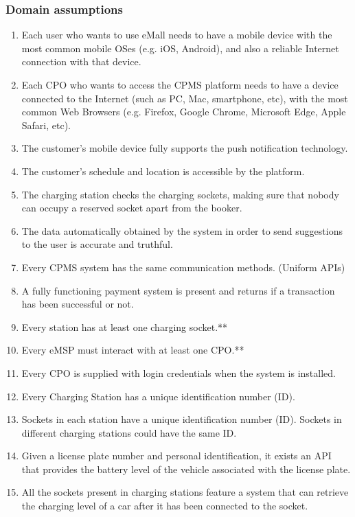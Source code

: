 \subsubsection{Domain assumptions}
\begin{enumerate}[label=\textbf{D\arabic*}:]
    \item Each user who wants to use eMall needs to have a mobile device with the most common mobile OSes (e.g. iOS, Android), and also a reliable Internet connection with that device.
    \item Each CPO who wants to access the CPMS platform needs to have a device connected to the Internet (such as PC, Mac, smartphone, etc), with the most common Web Browsers (e.g. Firefox, Google Chrome, Microsoft Edge, Apple Safari, etc).  
    \item The customer's mobile device fully supports the push notification technology.
    \item The customer's schedule and location is accessible by the platform.
    \item The charging station checks the charging sockets, making sure that nobody can occupy a reserved socket apart from the booker.
    \item The data automatically obtained by the system in order to send suggestions to the user is accurate and truthful.
    \item Every CPMS system has the same communication methods. (Uniform APIs)
    \item A fully functioning payment system is present and returns if a transaction has been successful or not.
    \item Every station has at least one charging socket.**
    \item Every eMSP must interact with at least one CPO.**
    \item Every CPO is supplied with login credentials when the system is installed.
    \item Every Charging Station has a unique identification number (ID).
    \item Sockets in each station have a unique identification number (ID). Sockets in different charging stations could have the same ID.
    \item Given a license plate number and personal identification, it exists an API that provides the battery level of the vehicle associated with the license plate.
    \item All the sockets present in charging stations feature a system that can retrieve the charging level of a car after it has been connected to the socket.
\end{enumerate}